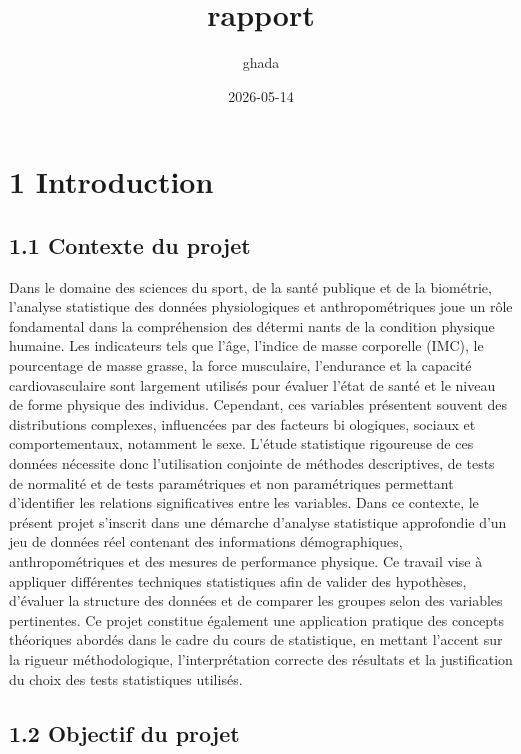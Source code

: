 \documentclass[
]{article}
\title{rapport}
\author{ghada}
\date{2026-05-14}
\begin{document}
\maketitle

\section{1 Introduction}\label{introduction}

\subsection{1.1 Contexte du projet}\label{contexte-du-projet}

Dans le domaine des sciences du sport, de la santé publique et de la
biométrie, l'analyse statistique des données physiologiques et
anthropométriques joue un rôle fondamental dans la compréhension des
détermi nants de la condition physique humaine. Les indicateurs tels que
l'âge, l'indice de masse corporelle (IMC), le pourcentage de masse
grasse, la force musculaire, l'endurance et la capacité cardiovasculaire
sont largement utilisés pour évaluer l'état de santé et le niveau de
forme physique des individus. Cependant, ces variables présentent
souvent des distributions complexes, influencées par des facteurs bi
ologiques, sociaux et comportementaux, notamment le sexe. L'étude
statistique rigoureuse de ces données nécessite donc l'utilisation
conjointe de méthodes descriptives, de tests de normalité et de tests
paramétriques et non paramétriques permettant d'identifier les relations
significatives entre les variables. Dans ce contexte, le présent projet
s'inscrit dans une démarche d'analyse statistique approfondie d'un jeu
de données réel contenant des informations démographiques,
anthropométriques et des mesures de performance physique. Ce travail
vise à appliquer différentes techniques statistiques afin de valider des
hypothèses, d'évaluer la structure des données et de comparer les
groupes selon des variables pertinentes. Ce projet constitue également
une application pratique des concepts théoriques abordés dans le cadre
du cours de statistique, en mettant l'accent sur la rigueur
méthodologique, l'interprétation correcte des résultats et la
justification du choix des tests statistiques utilisés.

\subsection{1.2 Objectif du projet}\label{objectif-du-projet}
\end{document}

